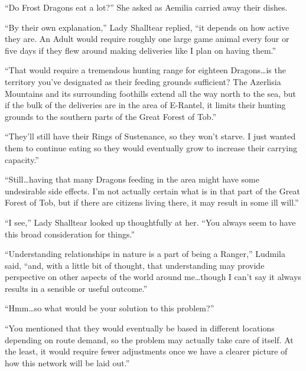  

“Do Frost Dragons eat a lot?” She asked as Aemilia carried away their dishes.

 

“By their own explanation,” Lady Shalltear replied, “it depends on how active they are. An Adult would require roughly one large game animal every four or five days if they flew around making deliveries like I plan on having them.”

 

“That would require a tremendous hunting range for eighteen Dragons…is the territory you’ve designated as their feeding grounds sufficient? The Azerlisia Mountains and its surrounding foothills extend all the way north to the sea, but if the bulk of the deliveries are in the area of E-Rantel, it limits their hunting grounds to the southern parts of the Great Forest of Tob.”

 

“They’ll still have their Rings of Sustenance, so they won’t starve. I just wanted them to continue eating so they would eventually grow to increase their carrying capacity.”

 

“Still…having that many Dragons feeding in the area might have some undesirable side effects. I’m not actually certain what is in that part of the Great Forest of Tob, but if there are citizens living there, it may result in some ill will.”

 

“I see,” Lady Shalltear looked up thoughtfully at her. “You always seem to have this broad consideration for things.”

 

“Understanding relationships in nature is a part of being a Ranger,” Ludmila said, “and, with a little bit of thought, that understanding may provide perspective on other aspects of the world around me…though I can’t say it always results in a sensible or useful outcome.”

 

“Hmm…so what would be your solution to this problem?”

 

“You mentioned that they would eventually be based in different locations depending on route demand, so the problem may actually take care of itself. At the least, it would require fewer adjustments once we have a clearer picture of how this network will be laid out.”

 

